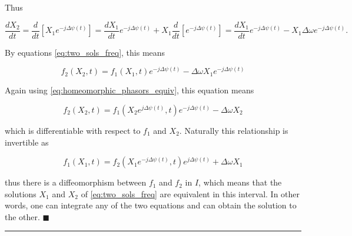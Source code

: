 	Thus

\begin{equation} \dfrac{dX_2}{dt} = \dfrac{d}{dt}\left[X_1e^{-j\Delta\psi(t)}\right] = \dfrac{dX_1}{dt}e^{-j\Delta\psi(t)} + X_1\dfrac{d}{dt}\left[e^{-j\Delta\psi(t)}\right] = \dfrac{dX_1}{dt}e^{-j\Delta\psi(t)} - X_1 \Delta\omega e^{-j\Delta\psi(t)}. \end{equation}

	By equations \eqref{eq:two_sols_freq}, this means

\begin{equation} f_2\left(X_2,t\right) = f_1\left(X_1,t\right)e^{-j\Delta\psi(t)} - \Delta\omega X_1 e^{-j\Delta\psi(t)} \end{equation}

	Again using \eqref{eq:homeomorphic_phasors_equiv}, this equation means

\begin{equation} f_2\left(X_2,t\right) = f_1\left(X_2e^{j\Delta\psi(t)},t\right)e^{-j\Delta\psi(t)} - \Delta\omega X_2 \end{equation}

	\noindent which is differentiable with respect to $f_1$ and $X_2$. Naturally this relationship is invertible as

\begin{equation} f_1\left(X_1,t\right) = f_2\left(X_1e^{-j\Delta\psi(t)},t\right)e^{j\Delta\psi(t)} + \Delta\omega X_1 \end{equation}

	\noindent thus there is a diffeomorphism between $f_1$ and $f_2$ in $I$, which means that the solutions $X_1$ and $X_2$ of \eqref{eq:two_sols_freq} are equivalent in this interval. In other words, one can integrate any of the two equations and can obtain the solution to the other. \hfill$\blacksquare$\vspace{5mm}\hrule\vspace{5mm} 

